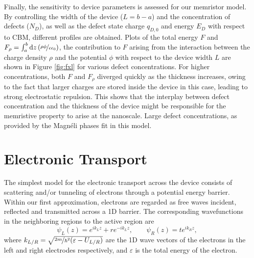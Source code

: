 Finally, the sensitivity to device parameters is assessed for our memristor model. By controlling the width of the device ($L = b - a$) and the concentration of defects ($N_D$), as well as the defect state charge $q_{D,0}$ and energy $E_D$ with respect to CBM, different profiles are obtained. Plots of the total energy $F$ and $F_{\rho} = \int_a^b \mathrm{d}z \left(\nicefrac{\rho \phi}{\epsilon \epsilon_0}\right)$, the contribution to $F$ arising from the interaction between the charge density $\rho$ and the potential $\phi$ with respect to the device width $L$ are shown in Figure \ref{fig:fxl} for various defect concentrations. For higher concentrations, both $F$ and $F_{\rho}$ diverged quickly as the thickness increases, owing to the fact that larger charges are stored inside the device in this case, leading to strong electrostatic repulsion. This shows that the interplay between defect concentration and the thickness of the device might be responsible for the memristive property to arise at the nanoscale. Large defect concentrations, as provided by the Magnéli phases fit in this model. %

\section{Electronic Transport}
\label{sec:transport}

The simplest model for the electronic transport across the device consists of scattering and/or tunneling of electrons through a potential energy barrier. Within our first approximation, electrons are regarded as free waves incident, reflected and transmitted across a 1D barrier. The corresponding wavefunctions in the neighboring regions to the active region are
\begin{equation}
	\psi_L(z) = e^{ik_Lz}+re^{-ik_Lz}, \qquad
	\psi_R(z) = te^{ik_Rz},
	\label{eq:wavefunct}
\end{equation}
where $k_{L/R}=\sqrt{\nicefrac{2m}{\hbar^2}(\varepsilon-U_{L/R})}$ are the 1D wave vectors of the electrons in the left and right electrodes respectively, and $\varepsilon$ is the total energy of the electron. 

